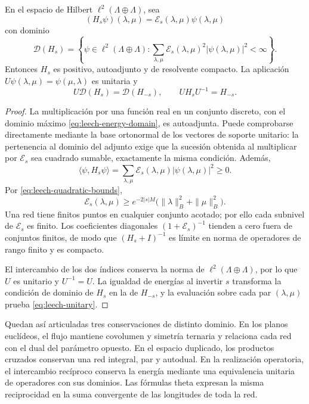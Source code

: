 \begin{theorem}
\label{thm:leech-energy}
En el espacio de Hilbert \(\ell^2(\Lambda\oplus\Lambda)\), sea
\[
 (H_s\psi)(\lambda,\mu)=
       \mathcal E_s(\lambda,\mu)\psi(\lambda,\mu)
\]
con dominio
\begin{equation}
 \mathcal D(H_s)=
 \left\{\psi\in\ell^2(\Lambda\oplus\Lambda):
 \sum_{\lambda,\mu}\mathcal E_s(\lambda,\mu)^2
             |\psi(\lambda,\mu)|^2<\infty\right\}.
 \label{eq:leech-energy-domain}
\end{equation}
Entonces \(H_s\) es positivo, autoadjunto y de resolvente compacto.
La aplicación \(U\psi(\lambda,\mu)=\psi(\mu,\lambda)\) es unitaria y
\begin{equation}
 U\mathcal D(H_s)=\mathcal D(H_{-s}),\qquad
 UH_sU^{-1}=H_{-s}.
 \label{eq:leech-unitary}
\end{equation}
\end{theorem}
\begin{proof}
La multiplicación por una función real en un conjunto discreto,
con el dominio máximo \eqref{eq:leech-energy-domain}, es
autoadjunta. Puede comprobarse directamente mediante la base
ortonormal de los vectores de soporte unitario: la pertenencia
al dominio del adjunto exige que la sucesión obtenida al
multiplicar por \(\mathcal E_s\) sea cuadrado sumable, exactamente
la misma condición. Además,
\[
 \langle\psi,H_s\psi\rangle
   =\sum_{\lambda,\mu}\mathcal E_s(\lambda,\mu)
                         |\psi(\lambda,\mu)|^2\geq0.
\]
Por \eqref{eq:leech-quadratic-bounds},
\[
 \mathcal E_s(\lambda,\mu)\geq
 e^{-2|s|M}\bigl(\|\lambda\|_B^2+\|\mu\|_B^2\bigr).
\]
Una red tiene finitos puntos en cualquier conjunto acotado; por
ello cada subnivel de \(\mathcal E_s\) es finito. Los coeficientes
diagonales \((1+\mathcal E_s)^{-1}\) tienden a cero fuera de
conjuntos finitos, de modo que \((H_s+I)^{-1}\) es límite en norma
de operadores de rango finito y es compacto.

El intercambio de los dos índices conserva la norma de
\(\ell^2(\Lambda\oplus\Lambda)\), por lo que \(U\) es unitario
y \(U^{-1}=U\). La igualdad de energías al invertir \(s\) transforma
la condición de dominio de \(H_s\) en la de \(H_{-s}\), y la
evaluación sobre cada par \((\lambda,\mu)\) prueba
\eqref{eq:leech-unitary}.
\end{proof}

Quedan así articuladas tres conservaciones de distinto dominio.
En los planos euclídeos, el flujo mantiene covolumen y simetría
ternaria y relaciona cada red con el dual del parámetro opuesto.
En el espacio duplicado, los productos cruzados conservan una
red integral, par y autodual. En la realización operatoria, el
intercambio recíproco conserva la energía mediante una equivalencia
unitaria de operadores con sus dominios. Las fórmulas theta
expresan la misma reciprocidad en la suma convergente de las
longitudes de toda la red.
